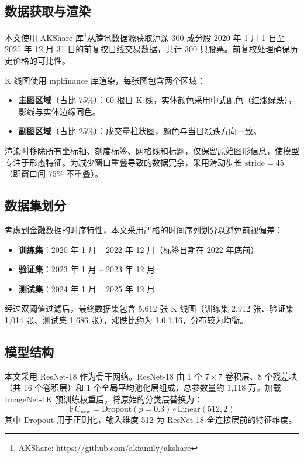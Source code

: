 \documentclass[12pt,a4paper]{ctexart}
\begin{document}
\subsection{数据获取与渲染}

本文使用 AKShare 库\footnote{AKShare: https://github.com/akfamily/akshare}从腾讯数据源获取沪深 300 成分股 2020 年 1 月 1 日至 2025 年 12 月 31 日的前复权日线交易数据，共计 300 只股票。前复权处理确保历史价格的可比性。

K 线图使用 mplfinance 库渲染，每张图包含两个区域：
\begin{itemize}[noitemsep]
    \item \textbf{主图区域}（占比 75\%）：60 根日 K 线，实体颜色采用中式配色（红涨绿跌），影线与实体边缘同色。
    \item \textbf{副图区域}（占比 25\%）：成交量柱状图，颜色与当日涨跌方向一致。
\end{itemize}

渲染时移除所有坐标轴、刻度标签、网格线和标题，仅保留原始图形信息，使模型专注于形态特征。为减少窗口重叠导致的数据冗余，采用滑动步长 $\text{stride}=45$（即窗口间 75\% 不重叠）。

\subsection{数据集划分}

考虑到金融数据的时序特性，本文采用严格的时间序列划分以避免前视偏差：
\begin{itemize}[noitemsep]
    \item \textbf{训练集}：2020 年 1 月 -- 2022 年 12 月（标签日期在 2022 年底前）
    \item \textbf{验证集}：2023 年 1 月 -- 2023 年 12 月
    \item \textbf{测试集}：2024 年 1 月 -- 2025 年 12 月
\end{itemize}

经过双阈值过滤后，最终数据集包含 5,612 张 K 线图（训练集 2,912 张、验证集 1,014 张、测试集 1,686 张），涨跌比约为 1.0:1.16，分布较为均衡。

\subsection{模型结构}

本文采用 ResNet-18 作为骨干网络。ResNet-18 由 1 个 $7 \times 7$ 卷积层、8 个残差块（共 16 个卷积层）和 1 个全局平均池化层组成，总参数量约 1,118 万。加载 ImageNet-1K 预训练权重后，将原始的分类层替换为：
\begin{equation}
\text{FC}_{\text{new}} = \text{Dropout}(p=0.3) \circ \text{Linear}(512, 2)
\end{equation}
其中 Dropout 用于正则化，输入维度 512 为 ResNet-18 全连接层前的特征维度。
\end{document}
